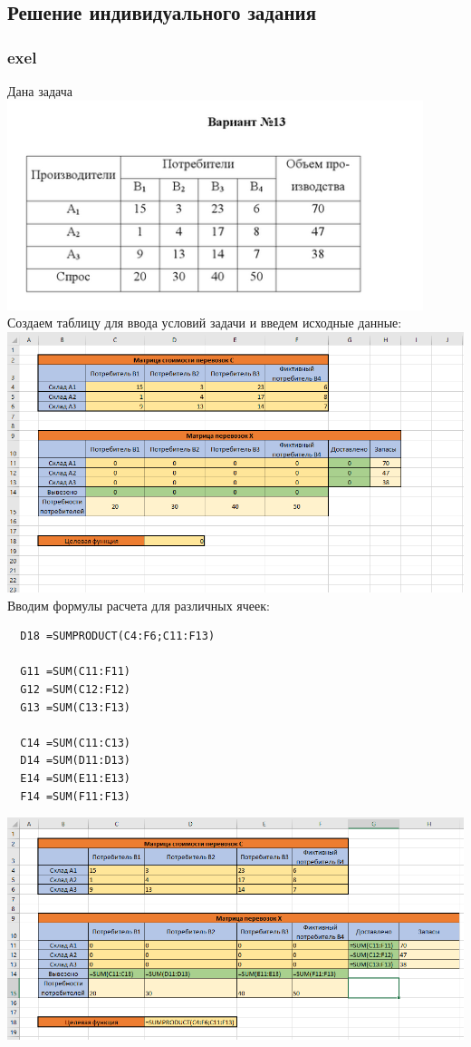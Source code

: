 \documentclass[a4paper, 12pt]{article}
\begin{document}
\subsection{Решение индивидуального задания}
\subsubsection{exel}
Дана задача \\
\includegraphics{2-1.png}\\
Создаем таблицу для ввода условий задачи и введем исходные данные:\\

\includegraphics[width=\textwidth]{2-2.png}\\

Вводим формулы расчета для различных ячеек:
\begin{verbatim}
  D18 =SUMPRODUCT(C4:F6;C11:F13)

  G11 =SUM(C11:F11)
  G12 =SUM(C12:F12)
  G13 =SUM(C13:F13)

  C14 =SUM(C11:C13)
  D14 =SUM(D11:D13)
  E14 =SUM(E11:E13)
  F14 =SUM(F11:F13)
\end{verbatim}

\includegraphics[width=\textwidth]{2-3.png}\\
\end{document}
